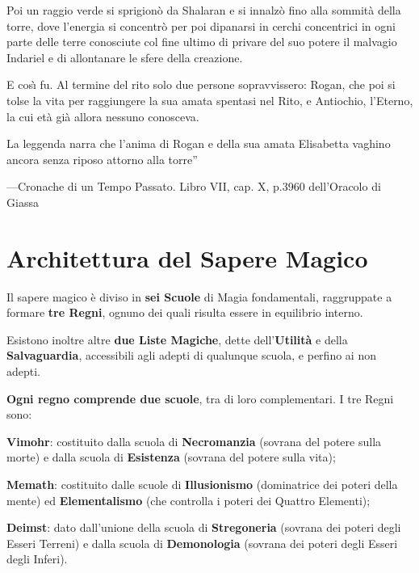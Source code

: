 \begin{racconto}
  Poi un raggio verde si sprigion\`o da Shalaran e si innalz\`o
  fino alla sommit\`a della torre, dove l'energia si concentr\`o
  per poi dipanarsi in cerchi concentrici in ogni parte delle terre
  conosciute col fine ultimo di privare del suo potere il malvagio
  Indariel e di allontanare le sfere della creazione.
  
  E cos\`{\i} fu. Al termine del rito solo due persone sopravvissero:
  Rogan, che poi si tolse la vita per raggiungere la sua amata
  spentasi nel Rito, e Antiochio, l'Eterno, la cui et\`a gi\`a
  allora nessuno conosceva.
  
  La leggenda narra che l'anima di Rogan e della sua amata Elisabetta
  vaghino ancora senza riposo attorno alla torre''

\bigskip
{\raggedleft\hfill\rm ---Cronache di un Tempo Passato. Libro VII, cap. X, p.3960 dell'Oracolo di Giassa}

\end{racconto}
\twocolumn
\fi

{\raggedright \section{Architettura del Sapere Magico}}

Il sapere magico \`e diviso in \textbf{sei Scuole} di Magia
fondamentali, raggruppate a formare \textbf{tre Regni},
ognuno dei quali risulta essere in equilibrio interno.

Esistono inoltre altre \textbf{due Liste Magiche}, dette
dell'\textbf{Utilit\`a} e della \textbf{Salvaguardia}, accessibili
agli adepti di qualunque scuola, e perfino ai non adepti.

\textbf{Ogni regno comprende due scuole}, tra di loro complementari. I tre
Regni sono:

\begin{description}
\item{\bf Vimohr}: costituito dalla scuola di \textbf{Necromanzia}
  (sovrana del potere sulla morte) e dalla scuola di
  \textbf{Esistenza} (sovrana del potere sulla vita);
\item{\bf Memath}: costituito dalle scuole di \textbf{Illusionismo}
  (dominatrice dei poteri della mente) ed \textbf{Elementalismo}
  (che controlla i poteri dei Quattro Elementi);
\item{\bf Deimst}: dato dall'unione della scuola di
  \textbf{Stregoneria} (sovrana dei poteri degli Esseri Terreni) e
  dalla scuola di \textbf{Demonologia} (sovrana dei poteri degli
  Esseri degli Inferi).
\end{description}

